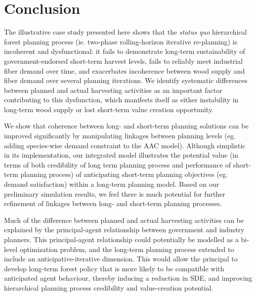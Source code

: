 \section{Conclusion}
\label{sec:conclusion1}

The illustrative case study presented here shows that the \emph{status quo}
hierarchical forest planning process (ie. two-phase rolling-horizon
iterative re-planning) is incoherent and dysfunctional: it fails to
demonstrate long-term sustainability of government-endorsed short-term
harvest levels, fails to reliably meet industrial fiber demand over
time, and exacerbates incoherence between wood supply and fiber demand
over several planning iterations. We identify systematic differences
between planned and actual harvesting activities as an important
factor contributing to this dysfunction, which manifests itself as
either instability in long-term wood supply or lost short-term value
creation opportunity.

We show that coherence between long- and short-term planning solutions
can be improved significantly by manipulating linkages between
planning levels (eg. adding species-wise demand constraint to the AAC
model). Although simplistic in its implementation, our integrated
model illustrates the potential value (in terms of both credibility of
long term planning process and performance of short-term planning
process) of anticipating short-term planning objectives (eg. demand
satisfaction) within a long-term planning model. Based on our
preliminary simulation results, we feel there is much potential for
further refinement of linkages between long- and short-term planning processes.

Much of the difference between planned and actual harvesting activities
can be explained by the principal-agent relationship between
government and industry planners. This principal-agent relationship
could potentially be modelled as a bi-level optimization problem, and
the long-term planning process extended to include an
anticipative-iterative dimension. This would allow the principal to
develop long-term forest policy that is more likely to be compatible
with anticipated agent behaviour, thereby inducing a reduction in SDE, and
improving hierarchical planning process credibility and value-creation potential.


